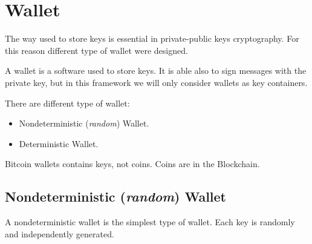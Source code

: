 
\chapter{Wallet} %

\label{wallet} %




The way used to store keys is essential in private-public keys cryptography. For this reason different type of wallet were designed.
\begin{definition}
	A wallet is a software used to store keys. It is able also to sign messages with the private key, but in this framework we will only consider wallets as key containers. 
\end{definition}
There are different type of wallet:
\begin{itemize}
	\item Nondeterministic (\textit{random}) Wallet.
	\item Deterministic Wallet.
\end{itemize}

\begin{remark}
	Bitcoin wallets contains keys, not coins. Coins are in the Blockchain.
\end{remark}

\section{Nondeterministic (\textit{random}) Wallet}
A nondeterministic wallet is the simplest type of wallet. Each key is randomly and independently generated.

